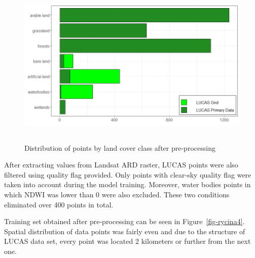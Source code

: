 \documentclass{amuthesis}
\begin{document}
\begin{figure}[H]

{\centering \includegraphics[width=5.55208in,height=3.125in]{./figures/lucas_data.png}

}

\caption{\label{fig-rycina3}Distribution of points by land cover class
after pre-processing}

\end{figure}

After extracting values from Landsat ARD raster, LUCAS points were also
filtered using quality flag provided. Only points with clear-sky quality
flag were taken into account during the model training. Moreover, water
bodies points in which NDWI was lower than 0 were also excluded. These
two conditions eliminated over 400 points in total.

Training set obtained after pre-processing can be seen in
Figure~\ref{fig-rycina4}. Spatial distribution of data points was fairly
even and due to the structure of LUCAS data set, every point was located
2 kilometers or further from the next one.
\end{document}
